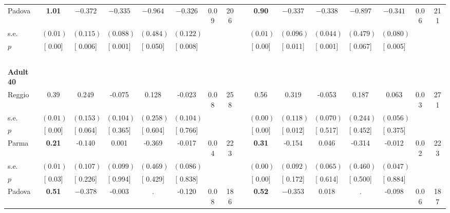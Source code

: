 \begin{longtable}{L{8em} c c c c c c c p{1em} c c c c c c c}
\quad \quad \quad Padova& \textbf{     1.01} & $ \mathbf{   -0.372}$ & $ \mathbf{   -0.335}$ & $ \mathbf{   -0.964}$ & $ \mathbf{   -0.326}$ &      0.09 &       206 & & \textbf{     0.90} & $ \mathbf{   -0.337}$ & $ \mathbf{   -0.338}$ & $ \mathbf{   -0.897}$ & $ \mathbf{   -0.341}$ &      0.06 &       211  \\*
\quad \quad \quad \quad s.e.& $ (     0.01)$ & $ (    0.115)$ & $ (    0.088)$ & $ (    0.484)$ & $ (    0.122)$ & & & & $ (     0.01)$ & $ (    0.096)$ & $ (    0.044)$ & $ (    0.479)$ & $ (    0.080)$ & &  \\*
\quad \quad \quad \quad $ p$ & [     0.00] & [    0.006] & [    0.001] & [    0.050] & [    0.008] & & & & [     0.00] & [    0.011] & [    0.001] & [    0.067] & [    0.005] & &  \\[1em]
~\\[1em]
\quad \quad \textbf{Adult 40} & & & & & & & & & & & & & & & \\* 
\quad \quad \quad Reggio& 0.39 & $ \mathbf{    0.249}$ &    -0.075 &     0.128 &    -0.023 &      0.08 &       258 & & 0.56 & $ \mathbf{    0.319}$ &    -0.053 &     0.187 &     0.063 &      0.03 &       271  \\*
\quad \quad \quad \quad s.e.& $ (     0.01)$ & $ (    0.153)$ & $ (    0.104)$ & $ (    0.258)$ & $ (    0.104)$ & & & & $ (     0.00)$ & $ (    0.118)$ & $ (    0.070)$ & $ (    0.244)$ & $ (    0.056)$ & &  \\*
\quad \quad \quad \quad $ p$ & [     0.00] & [    0.064] & [    0.365] & [    0.604] & [    0.766] & & & & [     0.00] & [    0.012] & [    0.517] & [    0.452] & [    0.375] & &  \\[1em]
\quad \quad \quad Parma& \textbf{     0.21} &    -0.140 &     0.001 &    -0.369 &    -0.017 &      0.04 &       223 & & \textbf{     0.31} &    -0.154 &     0.046 &    -0.314 &    -0.012 &      0.02 &       223  \\*
\quad \quad \quad \quad s.e.& $ (     0.01)$ & $ (    0.107)$ & $ (    0.099)$ & $ (    0.469)$ & $ (    0.086)$ & & & & $ (     0.00)$ & $ (    0.092)$ & $ (    0.065)$ & $ (    0.460)$ & $ (    0.047)$ & &  \\*
\quad \quad \quad \quad $ p$ & [     0.03] & [    0.226] & [    0.994] & [    0.429] & [    0.838] & & & & [     0.00] & [    0.172] & [    0.614] & [    0.500] & [    0.884] & &  \\[1em]
\quad \quad \quad Padova& \textbf{     0.51} & $ \mathbf{   -0.378}$ &    -0.003 &         . &    -0.120 &      0.08 &       186 & & \textbf{     0.52} & $ \mathbf{   -0.353}$ &     0.018 &         . &    -0.098 &      0.06 &       187  \\*

\end{longtable}
